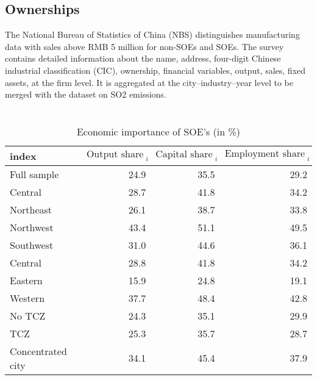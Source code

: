 \documentclass[12pt]{article}
\begin{document}
\subsection{Ownerships}

The National Bureau of Statistics of China (NBS) distinguishes manufacturing data with sales above RMB 5 million for non-SOEs and SOEs. The survey contains detailed information about the name, address, four-digit Chinese industrial classification (CIC), ownership, financial variables, output, sales, fixed assets, at the firm level. It is aggregated at the city–industry–year level to be merged with the dataset on SO2 emissions.


\begin{table}[!htb] \centering
\caption{\\ Economic importance of SOE's (in \%)}
\label{table_2}
\begin{adjustbox}{width=\textwidth, totalheight=\baselineskip,keepaspectratio}
\begin{tabular}{lrrr}
\toprule
index & $\text{Output share SOE}_i$ & $\text{Capital share SOE}_i$ & $\text{Employment share SOE}_i$ \\
\midrule
Full sample          &             24.9 &              35.5 &                 29.2 \\
Central              &             28.7 &              41.8 &                 34.2 \\
Northeast            &             26.1 &              38.7  &                33.8 \\
Northwest            &             43.4 &              51.1 &                 49.5 \\
Southwest            &             31.0 &              44.6 &                 36.1 \\
Central              &             28.8 &              41.8 &                 34.2 \\
Eastern              &             15.9 &              24.8 &                 19.1 \\
Western              &             37.7 &              48.4 &                 42.8 \\
No TCZ               &             24.3 &              35.1 &                 29.9 \\
TCZ                  &             25.3 &              35.7 &                 28.7 \\
Concentrated city    &             34.1 &              45.4 &                 37.9 \\

\end{tabular}
\end{adjustbox}
\end{table}
\end{document}
